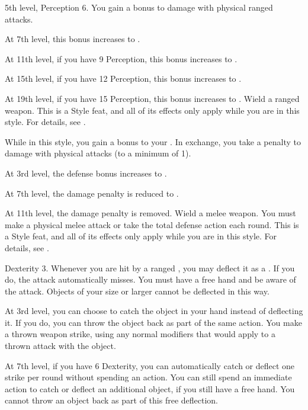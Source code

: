     \featpres 5th level, Perception 6.
    \featben You gain a  bonus to damage with physical ranged attacks.

    At 7th level, this bonus increases to .

    At 11th level, if you have 9 Perception, this bonus increases to .

    At 15th level, if you have 12 Perception, this bonus increases to .

    At 19th level, if you have 15 Perception, this bonus increases to .
    \stylereq Wield a ranged weapon.
     This is a Style feat, and all of its effects only apply while you are in this style.
    For details, see .

    \featben While in this style, you gain a  bonus to your .
    In exchange, you take a  penalty to damage with physical attacks (to a minimum of 1).

    At 3rd level, the defense bonus increases to .

    At 7th level, the damage penalty is reduced to .

    At 11th level, the damage penalty is removed.
    \stylereq Wield a melee weapon. You must make a physical melee attack or take the total defense action each round.
     This is a Style feat, and all of its effects only apply while you are in this style.
    For details, see .

    \featpres Dexterity 3.
    \featben Whenever you are hit by a ranged , you may deflect it as a .
    If you do, the attack automatically misses.
    You must have a free hand and be aware of the attack.
    Objects of your size or larger cannot be deflected in this way.

    At 3rd level, you can choose to catch the object in your hand instead of deflecting it.
    If you do, you can throw the object back as part of the same action.
    You make a thrown weapon strike, using any normal modifiers that would apply to a thrown attack with the object.

    At 7th level, if you have 6 Dexterity, you can automatically catch or deflect one strike per round without spending an action.
    You can still spend an immediate action to catch or deflect an additional object, if you still have a free hand.
    You cannot throw an object back as part of this free deflection.

